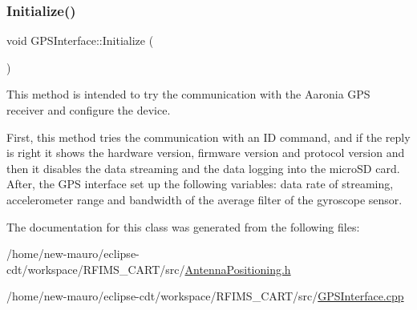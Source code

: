 \subsubsection{\texorpdfstring{Initialize()}{Initialize()}}
{\footnotesize\ttfamily void G\+P\+S\+Interface\+::\+Initialize (\begin{DoxyParamCaption}{ }\end{DoxyParamCaption})}



This method is intended to try the communication with the Aaronia G\+PS receiver and configure the device. 

First, this method tries the communication with an ID command, and if the reply is right it shows the hardware version, firmware version and protocol version and then it disables the data streaming and the data logging into the micro\+SD card. After, the G\+PS interface set up the following variables\+: data rate of streaming, accelerometer range and bandwidth of the average filter of the gyroscope sensor. 

The documentation for this class was generated from the following files\+:\begin{DoxyCompactItemize}
\item 
/home/new-\/mauro/eclipse-\/cdt/workspace/\+R\+F\+I\+M\+S\+\_\+\+C\+A\+R\+T/src/\hyperlink{AntennaPositioning_8h}{Antenna\+Positioning.\+h}\item 
/home/new-\/mauro/eclipse-\/cdt/workspace/\+R\+F\+I\+M\+S\+\_\+\+C\+A\+R\+T/src/\hyperlink{GPSInterface_8cpp}{G\+P\+S\+Interface.\+cpp}\end{DoxyCompactItemize}
